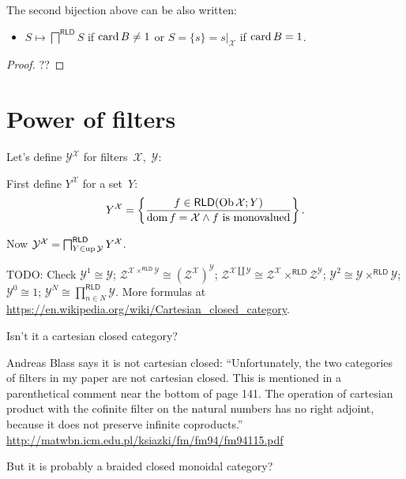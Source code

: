 \begin{prop}
  The second bijection above can be also written:

  \begin{itemize}
    \item $S \mapsto \bigsqcap^{\mathsf{RLD}} S$ if $\operatorname{card} B\ne 1$ or
      $S = \{s\} = s|_{\mathcal{X}}$ if $\operatorname{card} B=1$.
  \end{itemize}
\end{prop}

\begin{proof}
??
\end{proof}

\section{Power of filters}

Let's define $\mathcal{Y}^{\mathcal{X}}$ for filters~$\mathcal{X}$,~$\mathcal{Y}$:

First define $Y^{\mathcal{X}}$ for a set~$Y$:
\[ Y^{\mathcal{X}} = \left\{ \frac{ f \in \mathsf{RLD} (\operatorname{Ob} \mathcal{X}
   ; Y) }{ \operatorname{dom} f = \mathcal{X} \wedge f\text{ is monovalued} }\right\} . \]

Now $\mathcal{Y}^{\mathcal{X}} = \bigsqcap^{\mathsf{RLD}}_{Y \in
\operatorname{up} \mathcal{Y}} Y^{\mathcal{X}}$.

TODO: Check $\mathcal{Y}^1 \cong \mathcal{Y}$; $\mathcal{Z}^{\mathcal{X}
\times^{\mathsf{RLD}} \mathcal{Y}} \cong
(\mathcal{Z}^{\mathcal{X}})^{\mathcal{Y}}$; $\mathcal{Z}^{\mathcal{X} \amalg
\mathcal{Y}} \cong \mathcal{Z}^{\mathcal{X}} \times^{\mathsf{RLD}}
\mathcal{Z}^{\mathcal{Y}}$; $\mathcal{Y}^2 \cong \mathcal{Y}\times^{\mathsf{RLD}}\mathcal{Y}$;
$\mathcal{Y}^0 \cong 1$; $\mathcal{Y}^N \cong \prod^{\mathsf{RLD}}_{n\in N}\mathcal{Y}$.
More formulas at \url{https://en.wikipedia.org/wiki/Cartesian_closed_category}.

Isn't it a cartesian closed category?

Andreas Blass says it is not cartesian closed: ``Unfortunately, the two categories of filters in my paper are
not cartesian closed.  This is mentioned in a parenthetical comment
near the bottom of page 141.  The operation of cartesian product with
the cofinite filter on the natural numbers has no right adjoint,
because it does not preserve infinite coproducts.''
\url{http://matwbn.icm.edu.pl/ksiazki/fm/fm94/fm94115.pdf}

But it is probably a braided closed monoidal category?